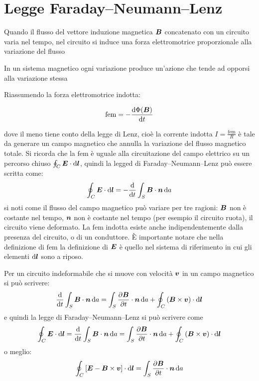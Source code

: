\section{Legge Faraday--Neumann--Lenz}
\begin{legge}
  Quando il flusso del vettore induzione magnetica $\boldsymbol{B}$ concatenato con un circuito varia nel tempo, nel circuito si induce una forza elettromotrice proporzionale alla variazione del flusso
\end{legge}
\begin{legge}[Lenz]
  In un sistema magnetico ogni variazione produce un'azione che tende ad opporsi alla variazione stessa
\end{legge}
Riassumendo la forza elettromotrice indotta:
\begin{legge}
  \begin{equation}
    \mathrm{fem}=-\frac{\mathrm{d}\Phi(\boldsymbol{B})}{\mathrm{d} t}
  \end{equation}
\end{legge}
dove il meno tiene conto della legge di Lenz, cioè la corrente indotta $I=\frac{\mathrm{fem}}{R}$ è tale da generare un campo magnetico che annulla la variazione del flusso magnetico totale. Si ricorda che la $\mathrm{fem}$ è uguale alla circuitazione del campo elettrico su un percorso chiuso $\oint_C\boldsymbol{E}\cdot\mathrm{d}\boldsymbol{l}$, quindi la legged di Faraday--Neumann--Lenz può essere scritta come:
\begin{equation}
  \oint_C\boldsymbol{E}\cdot\mathrm{d} \boldsymbol{l} = -\frac{\mathrm{d}}{\mathrm{d} t}\int_S\boldsymbol{B}\cdot\boldsymbol{n}\,\mathrm{d} a
\end{equation}
si noti come il flusso del campo magnetico può variare per tre ragioni: $\boldsymbol{B}$ non è costante nel tempo, $\boldsymbol{n}$ non è costante nel tempo (per esempio il circuito ruota), il circuito viene deformato. La $\mathrm{fem}$ indotta esiste anche indipendentemente dalla presenza del circuito, o di un conduttore. È importante notare che nella definizione di $\mathrm{fem}$ la definizione di $\boldsymbol{E}$ è quello nel sistema di riferimento in cui gli elementi $\mathrm{d}\boldsymbol{l}$ sono a riposo.

Per un circuito indeformabile che si muove con velocità $\boldsymbol{v}$ in un campo magnetico si può scrivere:
\begin{equation}
  \frac{\mathrm{d}}{\mathrm{d} t}\int_S \boldsymbol{B}\cdot \boldsymbol{n}\,\mathrm{d} a = \int_S\frac{\partial \boldsymbol{B}}{\partial t}\cdot\boldsymbol{n}\,\mathrm{d} a + \oint_C \left(\boldsymbol{B}\times\boldsymbol{v}\right)\cdot\mathrm{d}\boldsymbol{l}
\end{equation}
e quindi la legge di Faraday--Neumann--Lenz si può scrivere come
\[
  \oint_C\boldsymbol{E}\cdot\mathrm{d} \boldsymbol{l} = \frac{\mathrm{d}}{\mathrm{d} t}\int_S \boldsymbol{B}\cdot \boldsymbol{n}\,\mathrm{d} a = \int_S\frac{\partial \boldsymbol{B}}{\partial t}\cdot\boldsymbol{n}\,\mathrm{d} a + \oint_C \left(\boldsymbol{B}\times\boldsymbol{v}\right)\cdot\mathrm{d}\boldsymbol{l}
\]
o meglio:
\begin{equation}
  \oint_C \left[\boldsymbol{E} - \boldsymbol{B}\times\boldsymbol{v} \right]\cdot\mathrm{d} \boldsymbol{l} = \int_S\frac{\partial \boldsymbol{B}}{\partial t}\cdot\boldsymbol{n}\,\mathrm{d} a
\end{equation}
